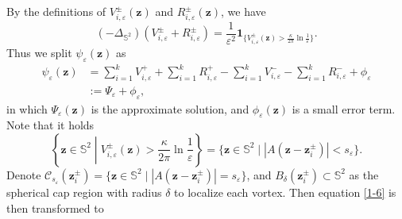 \documentclass[12pt,reqno]{amsart}
\numberwithin{equation}{section}
\theoremstyle{definition}
\theoremstyle{remark}
\begin{document}
    By the definitions of $V^\pm_{i,\varepsilon}(\boldsymbol z)$ and $R^\pm_{i,\varepsilon}(\boldsymbol z)$, we have
	\begin{equation*}
		(-\Delta_{\mathbb S^2})\left(V^\pm_{i,\varepsilon}+R^\pm_{i,\varepsilon}\right)=\frac{1}{\varepsilon^2}\boldsymbol1_{\{V^\pm_{i,\varepsilon}(\boldsymbol z)>\frac{\kappa}{2\pi}\ln\frac{1}{\varepsilon}\}}.
	\end{equation*}
	Thus we split $\psi_\varepsilon(\boldsymbol z)$ as
	\begin{align*}
		\psi_\varepsilon(\boldsymbol z)&=\sum\limits_{i=1}^kV^+_{i,\varepsilon}+\sum\limits_{i=1}^kR^+_{i,\varepsilon}-\sum\limits_{i=1}^kV^-_{i,\varepsilon}-\sum\limits_{i=1}^kR^-_{i,\varepsilon}+\phi_\varepsilon\\
		&:= \Psi_\varepsilon+\phi_\varepsilon,
	\end{align*}
	in which $\Psi_\varepsilon(\boldsymbol z)$ is the approximate solution, and $\phi_\varepsilon(\boldsymbol z)$ is a small error term. Note that it holds 
	\begin{equation}\label{2-2}
	\left\{\boldsymbol z\in \mathbb S^2 \; \left\vert \; V^\pm_{i,\varepsilon}(\boldsymbol z)>\frac{\kappa}{2\pi}\ln\frac{1}{\varepsilon}\right.\right\}=\{\boldsymbol z\in \mathbb S^2\mid |A(\boldsymbol z-\boldsymbol z^\pm_i)|< s_\varepsilon\}.
	\end{equation}
	Denote $\mathcal C_{s_\varepsilon}(\boldsymbol z_i^\pm)=\{\boldsymbol z\in \mathbb S^2\mid |A(\boldsymbol z-\boldsymbol z^\pm_i)|= s_\varepsilon\}$, 
	and $B_\delta(\boldsymbol z_i^\pm)\subset \mathbb S^2$ as the spherical cap region with radius $\delta$ to localize each vortex. 
	Then equation \eqref{1-6} is then transformed to
\end{document}
